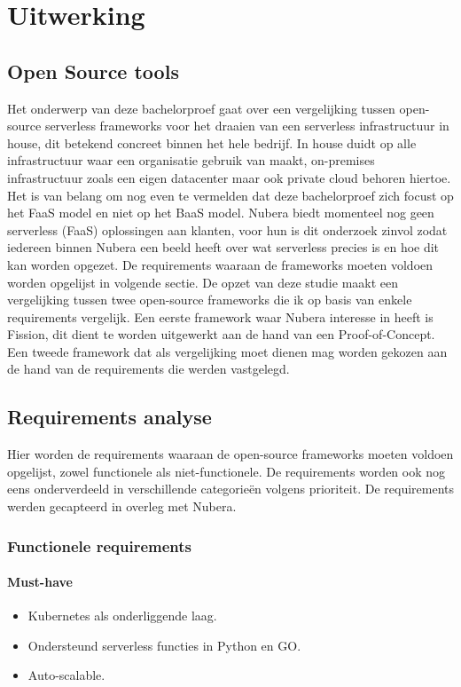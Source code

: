 \chapter{Uitwerking}
\label{ch:uitwerking}
\section{Open Source tools}
Het onderwerp van deze bachelorproef gaat over een vergelijking tussen open-source serverless frameworks voor het draaien van een serverless infrastructuur in house, dit betekend concreet binnen het hele bedrijf. In house duidt op alle infrastructuur waar een organisatie gebruik van maakt, on-premises infrastructuur zoals een eigen datacenter maar ook private cloud behoren hiertoe. Het is van belang om nog even te vermelden dat deze bachelorproef zich focust op het FaaS model en niet op het BaaS model. Nubera biedt momenteel nog geen serverless (FaaS) oplossingen aan klanten, voor hun is dit onderzoek zinvol zodat iedereen binnen Nubera een beeld heeft over wat serverless precies is en hoe dit kan worden opgezet. De requirements waaraan de frameworks moeten voldoen worden opgelijst in volgende sectie. De opzet van deze studie maakt een vergelijking tussen twee open-source frameworks die ik op basis van enkele requirements vergelijk. Een eerste framework waar Nubera interesse in heeft is Fission, dit dient te worden uitgewerkt aan de hand van een Proof-of-Concept. Een tweede framework dat als vergelijking moet dienen mag worden gekozen aan de hand van de requirements die werden vastgelegd.

\section{Requirements analyse}
Hier worden de requirements waaraan de open-source frameworks moeten voldoen opgelijst, zowel functionele als niet-functionele. De requirements worden ook nog eens onderverdeeld in verschillende categorieën volgens prioriteit. De requirements werden gecapteerd in overleg met Nubera.

\subsection{Functionele requirements}
\subsubsection{Must-have}
\begin{itemize}
    \item Kubernetes als onderliggende laag.
    \item Ondersteund serverless functies in Python en GO.
    \item Auto-scalable.
\end{itemize}
